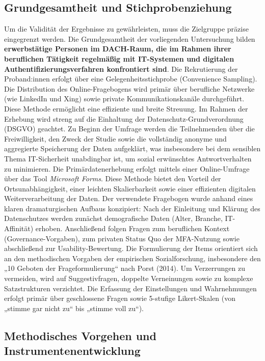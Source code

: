 \subsection{Grundgesamtheit und Stichprobenziehung}
Um die Validität der Ergebnisse zu gewährleisten, muss die Zielgruppe präzise eingegrenzt werden. Die Grundgesamtheit der vorliegenden Untersuchung bilden \textbf{erwerbstätige Personen im DACH-Raum, die im Rahmen ihrer beruflichen Tätigkeit regelmäßig mit IT-Systemen und digitalen Authentifizierungsverfahren konfrontiert sind}. 
Die Rekrutierung der Proband:innen erfolgt über eine Gelegenheitsstichprobe (Convenience Sampling). Die Distribution des Online-Fragebogens wird primär über berufliche Netzwerke (wie LinkedIn und Xing) sowie private Kommunikationskanäle durchgeführt. Diese Methode ermöglicht eine effiziente und breite Streuung. Im Rahmen der Erhebung wird streng auf die Einhaltung der Datenschutz-Grundverordnung (DSGVO) geachtet. Zu Beginn der Umfrage werden die Teilnehmenden über die Freiwilligkeit, den Zweck der Studie sowie die vollständig anonyme und aggregierte Speicherung der Daten aufgeklärt, was insbesondere bei dem sensiblen Thema IT-Sicherheit unabdingbar ist, um sozial erwünschtes Antwortverhalten zu minimieren.
Die Primärdatenerhebung erfolgt mittels einer Online-Umfrage über das Tool \textit{Microsoft Forms}. Diese Methode bietet den Vorteil der Ortsunabhängigkeit, einer leichten Skalierbarkeit sowie einer effizienten digitalen Weiterverarbeitung der Daten.
Der verwendete Fragebogen wurde anhand eines klaren dramaturgischen Aufbaus konzipiert: Nach der Einleitung und Klärung des Datenschutzes werden zunächst demografische Daten (Alter, Branche, IT-Affinität) erhoben. Anschließend folgen Fragen zum beruflichen Kontext (Governance-Vorgaben), zum privaten Status Quo der MFA-Nutzung sowie abschließend zur Usability-Bewertung.
Die Formulierung der Items orientiert sich an den methodischen Vorgaben der empirischen Sozialforschung, insbesondere den „10 Geboten der Frageformulierung“ nach Porst (2014). Um Verzerrungen zu vermeiden, wird auf Suggestivfragen, doppelte Verneinungen sowie zu komplexe Satzstrukturen verzichtet. Die Erfassung der Einstellungen und Wahrnehmungen erfolgt primär über geschlossene Fragen sowie 5-stufige Likert-Skalen (von „stimme gar nicht zu“ bis „stimme voll zu“). 

\subsection{Methodisches Vorgehen und Instrumentenentwicklung}

